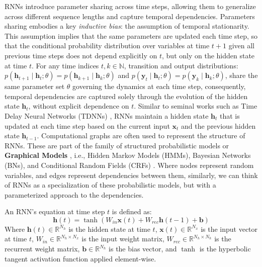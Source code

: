  RNNs introduce parameter sharing across time steps, allowing them to generalize across different sequence lengths and capture temporal dependencies.
Parameters sharing embodies a key \textit{inductive bias}: the assumption of temporal stationarity.
This assumption implies that the same parameters are updated each time step, so that the conditional probability distribution over variables at time
$t+1$ given all previous time steps does not depend explicitly on $t$, but only on the hidden state at time $t$.\newline\newline
For any time indices $t,k \in \mathbb{N}$, transition and output distributions: $p(\mathbf{h}_{t+1} \mid \mathbf{h}_{t}; \theta) = p(\mathbf{h}_{k+1} \mid \mathbf{h}_{k}; \theta)$ and 
$p(\mathbf{y}_{t} \mid \mathbf{h}_{t}; \theta) = p(\mathbf{y}_{k} \mid \mathbf{h}_{k}; \theta)$, share the same parameter set $\theta$ governing the dynamics at each time step, 
consequently, temporal dependencies are captured solely through the evolution of the hidden state $\mathbf{h}_t$, without explicit 
dependence on $t$.
\newline\newline
 Similar to seminal works such as Time Delay Neural Networks (TDNNs) \cite{peddinti15b_interspeech}, 
 RNNs maintain a hidden state $\mathbf{h}_t$ that is updated at each time step based on the current input $\mathbf{x}_t$ and the previous hidden state $\mathbf{h}_{t-1}$.
\newline
Computational graphs are often used to represent the structure of RNNs. These are part of the family of structured probabilistic models or 
\textbf{Graphical Models} \cite{barberBRML2011}, i.e., Hidden Markov Models (HMMs), Bayesian Networks (BNs), and Conditional Random Fields (CRFs) \cite[Ch. 4]{barberBRML2011}.
Where nodes represent random variables, and edges represent dependencies between them, similarly, we can think 
of RNNs as a specialization of these probabilistic models, but with a parameterized approach to the dependencies.
\newline

An RNN's equation at time step $t$ is defined as:
\begin{equation}
    \mathbf{h}(t) = \tanh(W_{in} \mathbf{x}(t) + W_{rec} \mathbf{h}(t-1) + \mathbf{b})
\end{equation}
Where $\mathbf{h}(t) \in \mathbb{R}^{N_h}$ is the hidden state at time $t$, $\mathbf{x}(t) \in \mathbb{R}^{N_x}$ is the input vector at time $t$,
$W_{in} \in \mathbb{R}^{N_h \times N_x}$ is the input weight matrix, $W_{rec} \in \mathbb{R}^{N_h \times N_h}$ is the recurrent weight matrix, $\mathbf{b} \in
    \mathbb{R}^{N_h}$ is the bias vector, and $\tanh$ is the hyperbolic tangent activation function applied element-wise.

